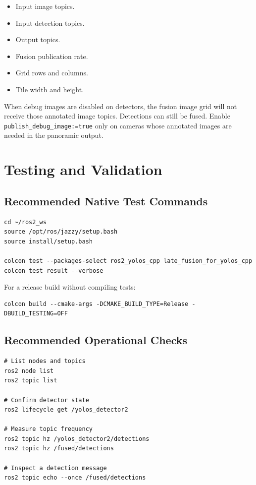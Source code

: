 \documentclass[11pt,a4paper]{article}
\begin{document}
\begin{itemize}
  \item Input image topics.
  \item Input detection topics.
  \item Output topics.
  \item Fusion publication rate.
  \item Grid rows and columns.
  \item Tile width and height.
\end{itemize}

When debug images are disabled on detectors, the fusion image grid will not receive those annotated image topics. Detections can still be fused. Enable \texttt{publish\_debug\_image:=true} only on cameras whose annotated images are needed in the panoramic output.

\section{Testing and Validation}

\subsection{Recommended Native Test Commands}

\begin{lstlisting}
cd ~/ros2_ws
source /opt/ros/jazzy/setup.bash
source install/setup.bash

colcon test --packages-select ros2_yolos_cpp late_fusion_for_yolos_cpp
colcon test-result --verbose
\end{lstlisting}

For a release build without compiling tests:

\begin{lstlisting}
colcon build --cmake-args -DCMAKE_BUILD_TYPE=Release -DBUILD_TESTING=OFF
\end{lstlisting}

\subsection{Recommended Operational Checks}

\begin{lstlisting}
# List nodes and topics
ros2 node list
ros2 topic list

# Confirm detector state
ros2 lifecycle get /yolos_detector2

# Measure topic frequency
ros2 topic hz /yolos_detector2/detections
ros2 topic hz /fused/detections

# Inspect a detection message
ros2 topic echo --once /fused/detections
\end{lstlisting}
\end{document}
